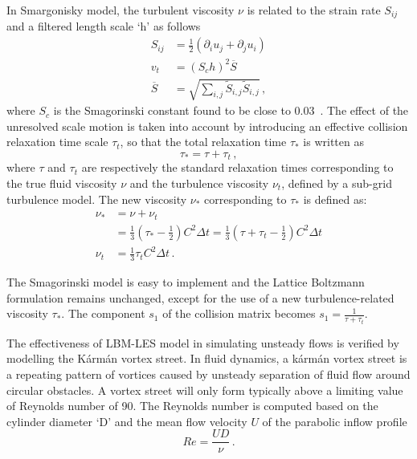 In Smargonisky model, the turbulent viscosity $\nu$ is related to the strain 
rate $S_{ij}$ and a filtered length scale `h' as follows
%
\begin{align}
S_{ij} & = \frac{1}{2}(\partial_i u_j + \partial_j u_i) \\
\mathit{v}_{\mathit{t}} & = (\mathit{S}_{c}\mathit{h})^{2}\overline{S} \\
\overline{S} & =  
\sqrt{\sum\limits_{\mathit{i,j}}{\tilde{S}_{\mathit{i,j}}\tilde{S}_{\mathit{i,j}}}}\,,
\end{align}
%
\noindent where $\mathit{S}_{c}$ is the Smagorinski constant found to be close 
to 0.03~\citep{yu2005}. 
%
The effect of the unresolved scale motion is taken into account by introducing 
an effective collision relaxation time scale $\tau_{t}$, so that the total 
relaxation time $\tau_{*}$ is written as
%
\begin{equation}
\tau_{*}=\tau + \tau_{t}\,,
\end{equation} 
%
\noindent where $\tau$ and $\tau_{t}$ are respectively the standard relaxation 
times 
corresponding to the true fluid viscosity $\nu$ and the turbulence 
viscosity $\nu_{\mathit{t}}$, defined by a sub-grid turbulence model. 
The new viscosity $\nu_{*}$ corresponding to $\tau_{*}$ is defined as:
%
\begin{align}
\nu_{*} & 
=\nu+\nu_{\mathit{t}} \nonumber \\
	& =\frac{1}{3}(\tau_{*}-\frac{1}{2})
\mathit{C}^{2} \Delta \mathit{t} 
=\frac{1}{3}(\tau+\tau_{t}-\frac{1}{2})\mathit{C}^{2} \Delta \mathit{t}  \\
\nu_{\mathit{t}} & =\frac{1}{3}\tau_{\mathit{t}}\mathit{C}^{2} \Delta 
\textit{t} \,.
\end{align} 

The Smagorinski model is easy to implement and the Lattice Boltzmann 
formulation remains unchanged, except for the use of a new turbulence-related 
viscosity $\tau_{*}$. The component $s_1$ of the collision matrix becomes $s_1 
= \frac{1}{\tau+\tau_t}$.

The effectiveness of LBM-LES model in simulating unsteady flows is verified by 
modelling the K\'{a}rm\'{a}n vortex street. In fluid dynamics, a k\'{a}rm\'{a}n 
vortex street is a repeating pattern of vortices caused by unsteady separation 
of fluid flow around circular obstacles. A vortex street will only form 
typically above a limiting value of Reynolds number of 90. The Reynolds number 
is computed based on the cylinder diameter `D' and the mean flow velocity $U$ 
of the parabolic inflow profile
%
\begin{equation}
\label{eq:reynolds}
Re=\frac{UD}{\nu}\,.
\end{equation}

